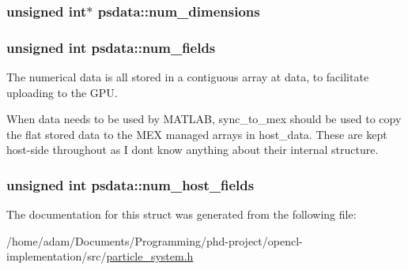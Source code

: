 \subsubsection[{num\+\_\+dimensions}]{\setlength{\rightskip}{0pt plus 5cm}unsigned int$\ast$ psdata\+::num\+\_\+dimensions}\label{structpsdata_ad8e436c4ea05c896d8efb2a79ae7bb18}
\hypertarget{structpsdata_a0c5e8cc0fa3042e37da915f97e76dce8}{}
\subsubsection[{num\+\_\+fields}]{\setlength{\rightskip}{0pt plus 5cm}unsigned int psdata\+::num\+\_\+fields}\label{structpsdata_a0c5e8cc0fa3042e37da915f97e76dce8}
The numerical data is all stored in a contiguous array at data, to facilitate uploading to the G\+P\+U.

When data needs to be used by M\+A\+T\+L\+A\+B, sync\+\_\+to\+\_\+mex should be used to copy the flat stored data to the M\+E\+X managed arrays in host\+\_\+data. These are kept host-\/side throughout as I don\textquotesingle{}t know anything about their internal structure. \hypertarget{structpsdata_a4b71cba344ccd849f7ae01779b9338a7}{}
\subsubsection[{num\+\_\+host\+\_\+fields}]{\setlength{\rightskip}{0pt plus 5cm}unsigned int psdata\+::num\+\_\+host\+\_\+fields}\label{structpsdata_a4b71cba344ccd849f7ae01779b9338a7}


The documentation for this struct was generated from the following file\+:\begin{DoxyCompactItemize}
\item 
/home/adam/\+Documents/\+Programming/phd-\/project/opencl-\/implementation/src/\hyperlink{particle__system_8h}{particle\+\_\+system.\+h}\end{DoxyCompactItemize}
